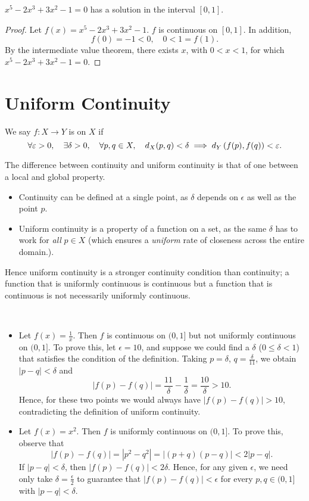 \begin{example}
$x^5-2x^3+3x^2-1=0$ has a solution in the interval $[0,1]$.
\begin{proof}
Let $f(x)=x^5-2x^3+3x^2-1$. $f$ is continuous on $[0,1]$. In addition,
\[f(0)=-1<0,\quad 0<1=f(1).\]
By the intermediate value theorem, there exists $x$, with $0<x<1$, for which $x^5-2x^3+3x^2-1=0$.
\end{proof}
\end{example}
\pagebreak

\section{Uniform Continuity}
\begin{definition}
We say $f\colon X\to Y$ is  on $X$ if
\[\forall\varepsilon>0,\quad\exists\delta>0,\quad\forall p,q\in X,\quad d_X(p,q)<\delta\implies d_Y\left(f(p),f(q)\right)<\varepsilon.\]
\end{definition}

\begin{remark}
The difference between continuity and uniform continuity is that of one between a local and global property.
\begin{itemize}
\item Continuity can be defined at a single point, as $\delta$ depends on $\epsilon$ as well as the point $p$.
\item Uniform continuity is a property of a function on a set, as the same $\delta$ has to work for \emph{all} $p\in X$ (which ensures a \emph{uniform} rate of closeness across the entire domain.).
\end{itemize}
Hence uniform continuity is a stronger continuity condition than continuity; a function that is uniformly continuous is continuous but a function that is continuous is not necessarily uniformly continuous.
\end{remark}

\begin{example} \
\begin{itemize}
\item Let $f(x)=\frac{1}{x}$. Then $f$ is continuous on $(0,1]$ but not uniformly continuous on $(0,1]$. To prove this, let $\epsilon=10$, and suppose we could find a $\delta$ ($0\le\delta<1$) that satisfies the condition of the definition. Taking $p=\delta$, $q=\frac{\delta}{11}$, we obtain $|p-q|<\delta$ and
\[|f(p)-f(q)|=\frac{11}{\delta}-\frac{1}{\delta}=\frac{10}{\delta}>10.\]
Hence, for these two points we would always have $|f(p)-f(q)|>10$, contradicting the definition of uniform continuity.

\item Let $f(x)=x^2$. Then $f$ is uniformly continuous on $(0,1]$. To prove this, observe that
\[|f(p)-f(q)|=|p^2-q^2|=|(p+q)(p-q)|<2|p-q|.\]
If $|p-q|<\delta$, then $|f(p)-f(q)|<2\delta$. Hence, for any given $\epsilon$, we need only take $\delta=\frac{\epsilon}{2}$ to guarantee that $|f(p)-f(q)|<\epsilon$ for every $p,q\in(0,1]$ with $|p-q|<\delta$.
\end{itemize}
\end{example}

